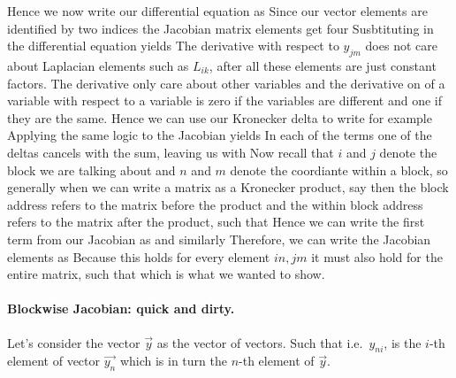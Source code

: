 Hence we now write our differential equation as 
Since our vector elements are identified by two indices the Jacobian matrix elements get four
Susbtituting in the differential equation yields 
The derivative with respect to $y_{jm}$ does not care about Laplacian elements such as $L_{ik}$, after all these elements are just constant factors. The derivative only care about other variables and the derivative on of a variable with respect to a variable is zero if the variables are different and one if they are the same. Hence we can use our Kronecker delta to write for example 
Applying the same logic to the Jacobian yields 
In each of the terms one of the deltas cancels with the sum, leaving us with 
Now recall that $i$ and $j$ denote the block we are talking about and $n$ and $m$ denote the coordiante within a block, so generally when we can write a matrix as a Kronecker product, say 
then the block address refers to the matrix before the product and the within block address refers to the matrix after the product, such that 
Hence we can write the first term from our Jacobian as 
and similarly 
Therefore, we can write the Jacobian elements as 
Because this holds for every element $in,jm$ it must also hold for the entire matrix, such that 
which is what we wanted to show. 

\paragraph{Blockwise Jacobian: quick and dirty.} 
Let's consider the vector $\vec{y}$ as the vector of vectors. Such that 
i.e.~$y_{ni}$, is the $i$-th element of vector $\vec{y_n}$ which is in turn the $n$-th element of $\vec{y}$. 

